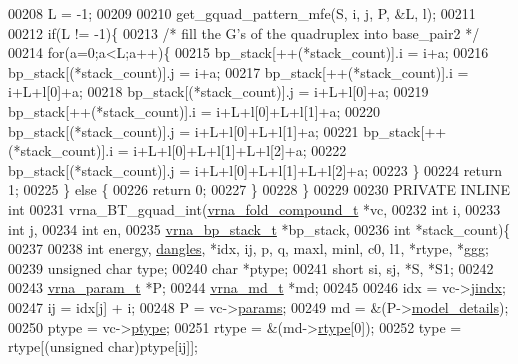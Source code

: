 \begin{DoxyCode}
00208   L = -1;
00209 
00210   get\_gquad\_pattern\_mfe(S, i, j, P, &L, l);
00211 
00212   \textcolor{keywordflow}{if}(L != -1)\{
00213     \textcolor{comment}{/* fill the G's of the quadruplex into base\_pair2 */}
00214     \textcolor{keywordflow}{for}(a=0;a<L;a++)\{
00215       bp\_stack[++(*stack\_count)].i = i+a;
00216       bp\_stack[(*stack\_count)].j   = i+a;
00217       bp\_stack[++(*stack\_count)].i = i+L+l[0]+a;
00218       bp\_stack[(*stack\_count)].j   = i+L+l[0]+a;
00219       bp\_stack[++(*stack\_count)].i = i+L+l[0]+L+l[1]+a;
00220       bp\_stack[(*stack\_count)].j   = i+L+l[0]+L+l[1]+a;
00221       bp\_stack[++(*stack\_count)].i = i+L+l[0]+L+l[1]+L+l[2]+a;
00222       bp\_stack[(*stack\_count)].j   = i+L+l[0]+L+l[1]+L+l[2]+a;
00223     \}
00224     \textcolor{keywordflow}{return} 1;
00225   \} \textcolor{keywordflow}{else} \{
00226     \textcolor{keywordflow}{return} 0;
00227   \}
00228 \}
00229 
00230 PRIVATE INLINE \textcolor{keywordtype}{int}
00231 vrna\_BT\_gquad\_int(\hyperlink{group__fold__compound_structvrna__fc__s}{vrna\_fold\_compound\_t} *vc,
00232                   \textcolor{keywordtype}{int} i,
00233                   \textcolor{keywordtype}{int} j,
00234                   \textcolor{keywordtype}{int} en,
00235                   \hyperlink{group__data__structures_structvrna__bp__stack__s}{vrna\_bp\_stack\_t} *bp\_stack,
00236                   \textcolor{keywordtype}{int} *stack\_count)\{
00237 
00238   \textcolor{keywordtype}{int}           energy, \hyperlink{group__model__details_ga72b511ed1201f7e23ec437e468790d74}{dangles}, *idx, ij, p, q, maxl, minl, c0, l1, *rtype, *ggg;
00239   \textcolor{keywordtype}{unsigned} \textcolor{keywordtype}{char} type;
00240   \textcolor{keywordtype}{char}          *ptype;
00241   \textcolor{keywordtype}{short}         si, sj, *S, *S1;
00242 
00243   \hyperlink{group__energy__parameters_structvrna__param__s}{vrna\_param\_t}  *P;
00244   \hyperlink{structvrna__md__s}{vrna\_md\_t}     *md;
00245 
00246   idx         = vc->\hyperlink{group__fold__compound_a5037235dee512efd85ca543780bbca1a}{jindx};
00247   ij          = idx[j] + i;
00248   P           = vc->\hyperlink{group__fold__compound_a19b8720c2c5321c1b97c830bd17566ea}{params};
00249   md          = &(P->\hyperlink{group__energy__parameters_a7b84353eb9075c595bad4ceb871bcae7}{model\_details});
00250   ptype       = vc->\hyperlink{group__fold__compound_a3fbea559f1d1976b2d67c215cdeee0b2}{ptype};
00251   rtype       = &(md->\hyperlink{structvrna__md__s_ad082d0fea31e002b90cdfe5e6382f8b0}{rtype}[0]);
00252   type        = rtype[(\textcolor{keywordtype}{unsigned} char)ptype[ij]];

\end{DoxyCode}
